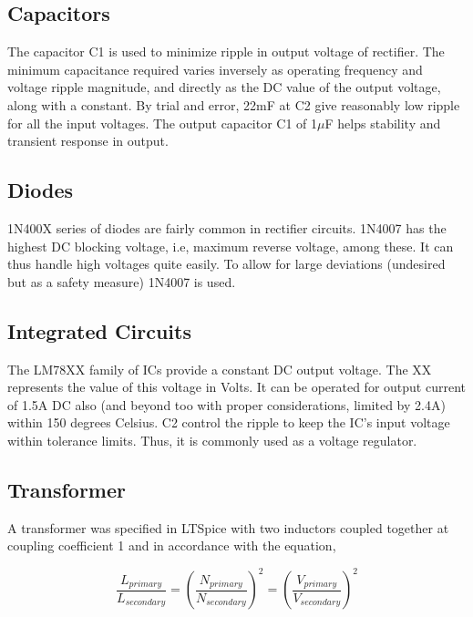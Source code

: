 \documentclass{article}
\begin{document}
\subsection{Capacitors}

The capacitor C1 is used to minimize ripple in output voltage of rectifier. The minimum capacitance required varies inversely as operating frequency and voltage ripple magnitude, and directly as the DC value of the output voltage, along with a constant. By trial and error, 22mF at C2 give reasonably low ripple for all the input voltages. The output capacitor C1 of 1$\mu$F helps stability and transient response in output.\cite{noauthor_smps_nodate}

\subsection{Diodes}

1N400X series of diodes\cite{noauthor_1n4001-1n4007_nodate} are fairly common in rectifier circuits. 1N4007 has the highest DC blocking voltage, i.e, maximum reverse voltage, among these. It can thus handle high voltages quite easily. To allow for large deviations (undesired but as a safety measure) 1N4007 is used. 

\subsection{Integrated Circuits}

The LM78XX family of ICs\cite{noauthor_lm7805_nodate} provide a constant DC output voltage. The XX represents the value of this voltage in Volts. It can be operated for output current of 1.5A DC also (and beyond too with proper considerations, limited by 2.4A) within 150 degrees Celsius. C2 control the ripple to keep the IC's input voltage within tolerance limits. Thus, it is commonly used as a voltage regulator.

\subsection{Transformer}

A transformer was specified in LTSpice\cite{noauthor_transformer_nodate} with two inductors coupled together at coupling coefficient 1 and in accordance with the equation,

\begin{equation}
 \frac{L_{primary}}{L_{secondary}} = {(\frac{N_{primary}}{N_{secondary}})}^2 = {(\frac{V_{primary}}{V_{secondary}})}^2   
\end{equation}
\end{document}
